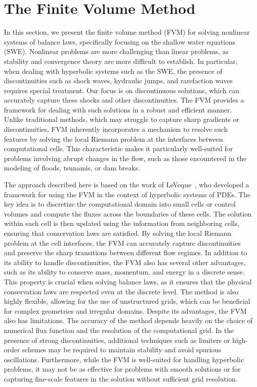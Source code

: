 \chapter{The Finite Volume Method}\label{ch:fvm}
In this section, we present the finite volume method (FVM) for solving nonlinear systems of balance laws, specifically focusing on the shallow water equations (SWE).
Nonlinear problems are more challenging than linear problems, as stability and convergence theory are more difficult to establish.
In particular, when dealing with hyperbolic systems such as the SWE, the presence of discontinuities such as shock waves, hydraulic jumps, and rarefaction waves requires special treatment.
Our focus is on discontinuous solutions, which can accurately capture these shocks and other discontinuities.
The FVM provides a framework for dealing with such solutions in a robust and efficient manner.
Unlike traditional methods, which may struggle to capture sharp gradients or discontinuities, FVM inherently incorporates a mechanism to resolve such features by solving the local Riemann problem at the interfaces between computational cells.
This characteristic makes it particularly well-suited for problems involving abrupt changes in the flow, such as those encountered in the modeling of floods, tsunamis, or dam breaks.

The approach described here is based on the work of LeVeque~\cite{LeVeque2002}, who developed a framework for using the FVM in the context of hyperbolic systems of PDEs.
The key idea is to discretize the computational domain into small cells or control volumes and compute the fluxes across the boundaries of these cells.
The solution within each cell is then updated using the information from neighboring cells, ensuring that conservation laws are satisfied.
By solving the local Riemann problem at the cell interfaces, the FVM can accurately capture discontinuities and preserve the sharp transitions between different flow regimes.
In addition to its ability to handle discontinuities, the FVM also has several other advantages, such as its ability to conserve mass, momentum, and energy in a discrete sense.
This property is crucial when solving balance laws, as it ensures that the physical conservation laws are respected even at the discrete level.
The method is also highly flexible, allowing for the use of unstructured grids, which can be beneficial for complex geometries and irregular domains.
Despite its advantages, the FVM also has limitations. The accuracy of the method depends heavily on the choice of numerical flux function and the resolution of the computational grid.
In the presence of strong discontinuities, additional techniques such as limiters or high-order schemes may be required to maintain stability and avoid spurious oscillations.
Furthermore, while the FVM is well-suited for handling hyperbolic problems, it may not be as effective for problems with smooth solutions or for capturing fine-scale features in the solution without sufficient grid resolution.

